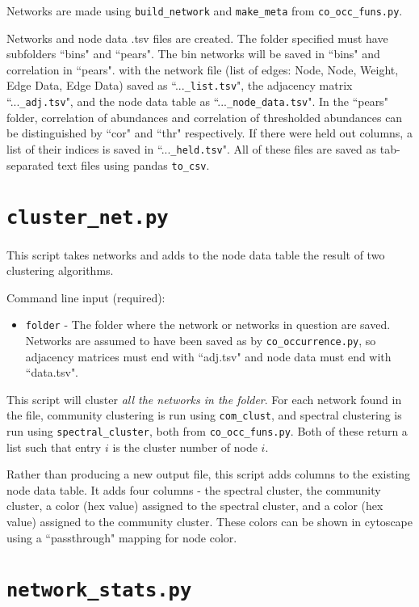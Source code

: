 \documentclass[10pt]{article}
\theoremstyle{definition}
\numberwithin{theorem}{section}
\numberwithin{definition}{section}
\numberwithin{lemma}{section}
\numberwithin{corollary}{section}
\numberwithin{clm}{section}
\numberwithin{rmk}{section}
\begin{document}
Networks are made using \verb|build_network| and \verb|make_meta| from \verb|co_occ_funs.py|. 

Networks and node data .tsv files are created. The folder specified must have subfolders ``bins" and ``pears". The bin networks will be saved in ``bins" and correlation in ``pears". with the network file (list of edges: Node, Node, Weight, Edge Data, Edge Data) saved as ``...\verb|_list.tsv|", the adjacency matrix ``...\verb|_adj.tsv|", and the node data table as ``...\verb|_node_data.tsv|". In the ``pears" folder, correlation of abundances and correlation of thresholded abundances can be distinguished by ``cor" and ``thr" respectively. If there were held out columns, a list of their indices is saved in ``...\verb|_held.tsv|". All of these files are saved as tab-separated text files using pandas \verb|to_csv|.

\cprotect \section{\verb|cluster_net.py|}

This script takes networks and adds to the node data table the result of two clustering algorithms. 

Command line input (required):
\begin{itemize}
	\item \verb|folder| - The folder where the network or networks in question are saved. Networks are assumed to have been saved as by \verb|co_occurrence.py|, so adjacency matrices must end with ``adj.tsv" and node data must end with ``data.tsv".
\end{itemize}

This script will cluster \emph{all the networks in the folder}. For each network found in the file, community clustering is run using 
\verb|com_clust|, and spectral clustering is run using \verb|spectral_cluster|, both from \verb|co_occ_funs.py|. Both of these return a list such that entry $i$ is the cluster number of node $i$.

Rather than producing a new output file, this script adds columns to the existing node data table. It adds four columns - the spectral cluster, the community cluster, a color (hex value) assigned to the spectral cluster, and a color (hex value) assigned to the community cluster. These colors can be shown in cytoscape using a ``passthrough" mapping for node color.

\cprotect \section{\verb|network_stats.py|}
\end{document}
